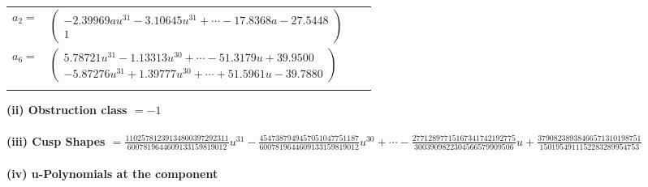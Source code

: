 \documentclass[1p]{elsarticle_modified}
\theoremstyle{definition}
\begin{document}
\begin{tabular}{m{7pt} m{180pt} m{7pt} m{180pt} }
\flushright $a_{2}=$&$\begin{pmatrix}-2.39969 a u^{31}-3.10645 u^{31}+\cdots-17.8368 a-27.5448\\1\end{pmatrix}$ \\
\flushright $a_{6}=$&$\begin{pmatrix}5.78721 u^{31}-1.13313 u^{30}+\cdots-51.3179 u+39.9500\\-5.87276 u^{31}+1.39777 u^{30}+\cdots+51.5961 u-39.7880\end{pmatrix}$\\&\end{tabular}
\flushleft \textbf{(ii) Obstruction class $= -1$}\\~\\
\flushleft \textbf{(iii) Cusp Shapes $= \frac{11025781239134800397292311}{6007819644609133159819012} u^{31}-\frac{4547387949457051047751187}{6007819644609133159819012} u^{30}+\cdots-\frac{27712897715167341742192775}{3003909822304566579909506} u+\frac{37908238938466571310198751}{1501954911152283289954753}$}\\~\\
\newpage\renewcommand{\arraystretch}{1}
\flushleft \textbf{(iv) u-Polynomials at the component}\newline \\
\end{document}
